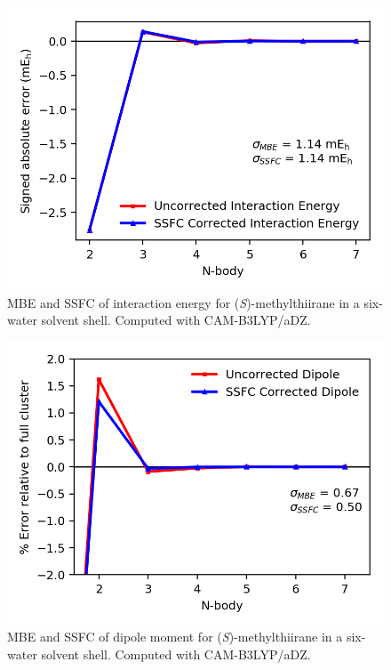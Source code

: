    \begin{figure}
        \centering
        \includegraphics[scale=0.75]{p1/graphs/si/metthi_6_cam_int.png}
        \caption{MBE and SSFC of interaction energy for (\textit{S})-methylthiirane in a six-water solvent shell. Computed with CAM-B3LYP/aDZ.}
        \label{metthi_6_cam_int}
    \end{figure}
    \begin{figure}
        \centering
        \includegraphics[scale=0.75]{p1/graphs/si/metthi_6_cam_dip.png}
        \caption{MBE and SSFC of dipole moment for (\textit{S})-methylthiirane in a six-water solvent shell. Computed with CAM-B3LYP/aDZ.}
        \label{metthi_6_cam_dip}
    \end{figure}

